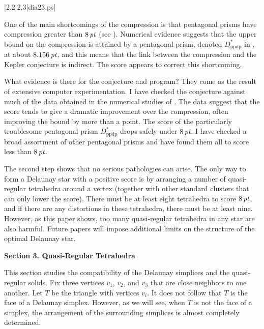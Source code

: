 \gram|2.2|2.3|dia23.ps|  %

One of the main shortcomings of the compression is that 
pentagonal prisms have compression
greater than $8\,\hbox{\it pt}$ (see \cite{H2}).
Numerical evidence suggests that
the upper bound on the compression is attained
by a pentagonal prism, denoted $D^*_{\operatorname{ppdp}}$ in \cite{H2},
at about $8.156\,\hbox{\it pt}$,
and this means that the link between the compression
and the Kepler conjecture is indirect.
The score appears to correct this shortcoming.  

What evidence is there for the conjecture and program?
They come as the result of extensive computer experimentation.
I have checked the conjecture against much of the data
obtained in the numerical studies of \cite{H2,9.3}.  
The data suggest that the score tends to give a dramatic
improvement over the compression, often improving
the bound by more than a point.  The score
of the particularly troublesome 
 pentagonal prism $D^*_{\operatorname{ppdp}}$ 
drops safely under $8\,\hbox{\it pt}$.  %
I have checked a broad assortment
of other pentagonal prisms and have found them all to score less
than $8\,\hbox{\it pt}$.  

The second step shows that no serious pathologies can arise.
The only way to form a Delaunay star with a positive score
is by arranging a number of quasi-regular tetrahedra
around a vertex (together with other standard clusters
that can only lower the score).  There must be at least
eight tetrahedra to score $8\,\hbox{\it pt}$, and if there are any
distortions in these tetrahedra, there must be at least
nine.  However, as this paper shows, too many quasi-regular
tetrahedra in any star are also harmful.  Future papers
will impose additional limits on the structure of the
optimal Delaunay star.


\bigskip
\centerline{\bf Section 3.  Quasi-Regular Tetrahedra}
\bigskip

This section studies the compatibility of the Delaunay simplices
and the quasi-regular solids.
Fix three
vertices $v_1$, $v_2$, and $v_3$ that are close neighbors to
one another.
Let $T$
be the triangle with vertices $v_i$.
It does not follow
that $T$ is the face of a Delaunay simplex.
However,
as we will see, when $T$ is not the face of a simplex, the
arrangement of the surrounding simplices is almost completely determined.

